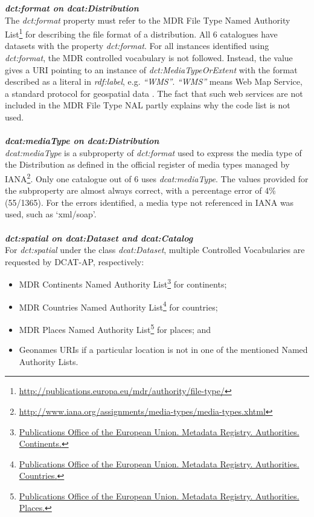 \documentclass[<options>]{elsarticle}
\begin{document}
\textbf{\textit{dct:format on dcat:Distribution}}\\
The \textit{dct:format} property must refer to the MDR File Type Named Authority List\footnote{\href{    http://publications.europa.eu/mdr/authority/file-type/}{http://publications.europa.eu/mdr/authority/file-type/}} for describing the file format of a distribution. All 6 catalogues have datasets with the property \textit{dct:format}. For all instances identified using \textit{dct:format}, the MDR controlled vocabulary is not followed. Instead, the value gives a URI pointing to an instance of \textit{dct:MediaTypeOrExtent} with the format described as a literal in \textit{rdf:label}, e.g. \textit{“WMS”}. \textit{“WMS”} means Web Map Service, a standard protocol for geospatial data . The fact that such web services are not included in the MDR File Type NAL partly explains why the code list is not used.
\\
\\
\textbf{\textit{dcat:mediaType on dcat:Distribution}}\\
\textit{dcat:mediaType }is a subproperty of \textit{dct:format} used to express the media type of the Distribution as defined in the official register of media types managed by IANA\footnote{\href{http://www.iana.org/assignments/media-types/media-types.xhtml}{         http://www.iana.org/assignments/media-types/media-types.xhtml}}. Only one catalogue out of 6 uses \textit{dcat:mediaType}. The values provided for the subproperty are almost always correct, with a percentage error of 4\% (55/1365). For the errors identified, a media type not referenced in IANA was used, such as ‘xml/soap’.
\\
\\
\textbf{\textit{dct:spatial on dcat:Dataset and dcat:Catalog}}\\
For \textit{dct:spatial} under the class \textit{dcat:Dataset}, multiple Controlled Vocabularies are requested by DCAT-AP, respectively:
\begin{itemize}
\item MDR Continents Named Authority List\footnote{\href{http://publications.europa.eu/mdr/authority/continent/
}{Publications Office of the European Union. Metadata Registry. Authorities. Continents.}} for continents;
\item MDR Countries Named Authority List\footnote{\href{http://publications.europa.eu/mdr/authority/country/}{Publications Office of the European Union. Metadata Registry. Authorities. Countries.}} for countries;
\item MDR Places Named Authority List\footnote{\href{    http://publications.europa.eu/mdr/authority/place/}{Publications Office of the European Union. Metadata Registry. Authorities. Places.}} for places; and
\item Geonames URIs if a particular location is not in one of the mentioned Named Authority Lists.
\end{itemize}
\end{document}
